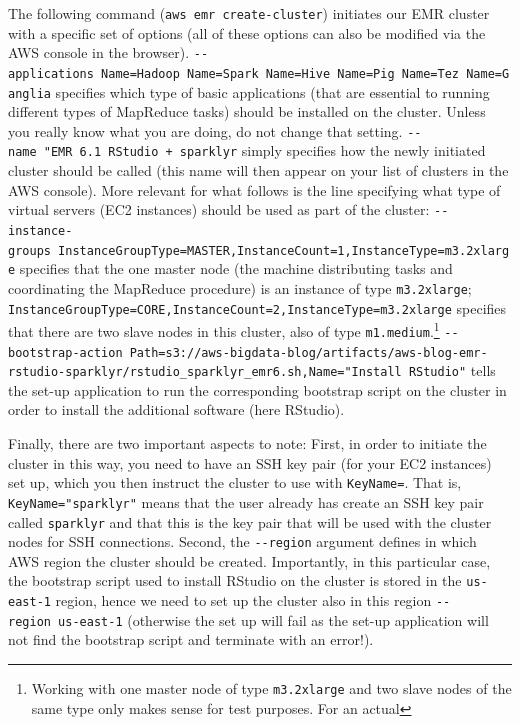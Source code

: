 \documentclass[
  12pt,
]{style/krantz}
\begin{document}
The following command (\texttt{aws\ emr\ create-cluster}) initiates our EMR cluster with a specific set of options (all of these options can also be modified via the AWS console in the browser). \texttt{-\/-applications\ Name=Hadoop\ Name=Spark\ Name=Hive\ Name=Pig\ Name=Tez\ Name=Ganglia} specifies which type of basic applications (that are essential to running different types of MapReduce tasks) should be installed on the cluster. Unless you really know what you are doing, do not change that setting. \texttt{-\/-name\ "EMR\ 6.1\ RStudio\ +\ sparklyr} simply specifies how the newly initiated cluster should be called (this name will then appear on your list of clusters in the AWS console). More relevant for what follows is the line specifying what type of virtual servers (EC2 instances) should be used as part of the cluster: \texttt{-\/-instance-groups\ InstanceGroupType=MASTER,InstanceCount=1,InstanceType=m3.2xlarge} specifies that the one master node (the machine distributing tasks and coordinating the MapReduce procedure) is an instance of type \texttt{m3.2xlarge}; \texttt{InstanceGroupType=CORE,InstanceCount=2,InstanceType=m3.2xlarge} specifies that there are two slave nodes in this cluster, also of type \texttt{m1.medium}.\footnote{Working with one master node of type \texttt{m3.2xlarge} and two slave nodes of the same type only makes sense for test purposes. For an actual} \texttt{-\/-bootstrap-action\ Path=s3://aws-bigdata-blog/artifacts/aws-blog-emr-rstudio-sparklyr/rstudio\_sparklyr\_emr6.sh,Name="Install\ RStudio"} tells the set-up application to run the corresponding bootstrap script on the cluster in order to install the additional software (here RStudio).

Finally, there are two important aspects to note: First, in order to initiate the cluster in this way, you need to have an SSH key pair (for your EC2 instances) set up, which you then instruct the cluster to use with \texttt{KeyName=}. That is, \texttt{KeyName="sparklyr"} means that the user already has create an SSH key pair called \texttt{sparklyr} and that this is the key pair that will be used with the cluster nodes for SSH connections. Second, the \texttt{-\/-region} argument defines in which AWS region the cluster should be created. Importantly, in this particular case, the bootstrap script used to install RStudio on the cluster is stored in the \texttt{us-east-1} region, hence we need to set up the cluster also in this region \texttt{-\/-region\ us-east-1} (otherwise the set up will fail as the set-up application will not find the bootstrap script and terminate with an error!).
\end{document}
